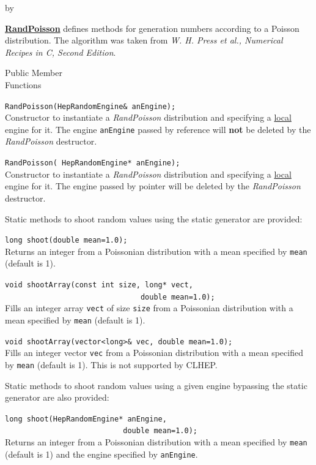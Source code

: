 \documentclass[twoside]{article}
\newcommand{\comp}[1]{\texttt{#1}}%
\newcommand{\entrylabel}[1]{\mbox{\textbf{{#1}}}\hfil}%
\newenvironment{entry}
{\begin{list}{}%
    {\renewcommand{\makelabel}{\entrylabel}%
     \setlength{\labelwidth}{90pt}%
     \setlength{\leftmargin}{\labelwidth}
     \advance\leftmargin by \labelsep%
      }%
    }%
  {\end{list}}
\newcommand{\Entrylabel}[1]%
{\raisebox{0pt}[1ex][0pt]{\makebox[\labelwidth][l]%
    {\parbox[t]{\labelwidth}{\hspace{0pt}\textbf{{#1}}}}}}
\newenvironment{Entry}%
{\renewcommand{\entrylabel}{\Entrylabel}\begin{entry}}%
  {\end{entry}}
\begin{document}
\begin{description}
\begin{Entry}
   \begin{description}
     \item \underline{\bf RandPoisson}  defines methods for generation numbers
       according to a Poisson distribution.  The algorithm was taken
       from {\em W. H. Press et al., Numerical Recipes in C, Second Edition}.
   \end{description}
   
\item[Public Member\\ Functions]

    \verb+RandPoisson(HepRandomEngine& anEngine);+\\
    Constructor to instantiate a {\em RandPoisson}
    distribution and specifying a \underline{local} engine for it.
    The engine \comp{anEngine} passed by reference will {\bf not}
    be deleted by the {\em RandPoisson} destructor.
  
    \verb+RandPoisson( HepRandomEngine* anEngine);+\\
    Constructor to instantiate a {\em RandPoisson}
    distribution and specifying a \underline{local} engine for it.
    The engine passed by pointer will be deleted by the {\em RandPoisson}
    destructor.

    Static methods to shoot random values using the static generator
    are provided:

    \verb+long shoot(double mean=1.0);+\\
    Returns an integer from a Poissonian distribution with a mean
    specified by \comp{mean} (default is 1).

    \verb+void shootArray(const int size, long* vect,+\\
    \verb+                               double mean=1.0);+\\
    Fills an integer array \comp{vect} of size \comp{size} from a
    Poissonian distribution with a mean specified by \comp{mean}
    (default is 1).

    \verb+void shootArray(vector<long>& vec, double mean=1.0);+\\
    Fills an integer vector \comp{vec} from a
    Poissonian distribution with a mean specified by \comp{mean}
    (default is 1).  This is not supported by CLHEP.

    Static methods to shoot random values using a given engine
    bypassing the static generator are also provided:

    \verb+long shoot(HepRandomEngine* anEngine,+\\
    \verb+                           double mean=1.0);+\\
    Returns an integer from a Poissonian distribution with a mean
    specified by \comp{mean} (default is 1) and the engine specified
    by \comp{anEngine}.
  

\end{Entry}
\end{description}
\end{document}
